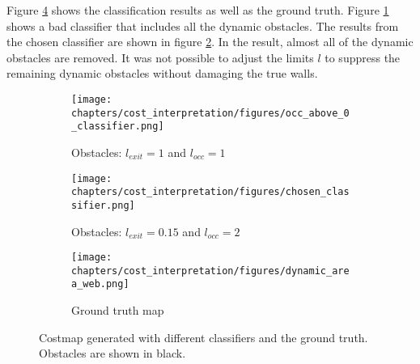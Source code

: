 Figure \ref{fig:amcl_classifier} shows the classification results as well as the ground truth. 
Figure \ref{fig:amcl_classifier:worst} shows a bad classifier that includes all the dynamic obstacles. 
The results from the chosen classifier are shown in figure \ref{fig:amcl_classifier:chosen}. In the result, almost all of the dynamic obstacles are removed. It was not possible to adjust the limits $l$ to suppress the remaining dynamic obstacles without damaging the true walls.
%
%
\begin{figure}[htbp]
	\label{fig:amcl_classifier}
	\begin{subfigure}[t]{0.3\linewidth}
		\centering
		\texttt{[image: chapters/cost\_interpretation/figures/occ\_above\_0\_classifier.png]}
		\caption{Obstacles: $l_{exit} = 1$ and $l_{occ} = 1$}
		\label{fig:amcl_classifier:worst}
	\end{subfigure}
	\hspace*{\fill}
	\begin{subfigure}[t]{0.3\linewidth}
		\centering
		\texttt{[image: chapters/cost\_interpretation/figures/chosen\_classifier.png]}
		\caption{Obstacles: $l_{exit} = 0.15$ and $l_{occ} = 2$}
		\label{fig:amcl_classifier:chosen}
	\end{subfigure}
	\hspace*{\fill}
	\begin{subfigure}[t]{0.3\linewidth}
		\centering
		\texttt{[image: chapters/cost\_interpretation/figures/dynamic\_area\_web.png]}
		\caption{Ground truth map}
		\label{fig:amcl_classifier:groundtruth}
	\end{subfigure}
	\caption{Costmap generated with different classifiers and the ground truth. Obstacles are shown in black.}
    \label{fig:amcl_classifier}
\end{figure}

